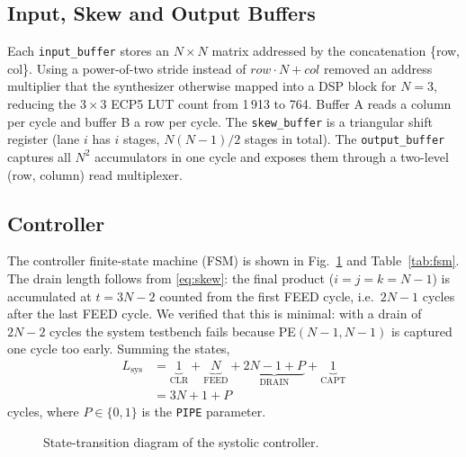 \documentclass[conference]{IEEEtran}
\begin{document}
\subsection{Input, Skew and Output Buffers}
Each \texttt{input\_buffer} stores an $N\times N$ matrix addressed by the
concatenation \{row, col\}. Using a power-of-two stride instead of
$\textit{row}\cdot N+\textit{col}$ removed an address multiplier that the
synthesizer otherwise mapped into a DSP block for $N=3$, reducing the
$3\times3$ ECP5 LUT count from 1\,913 to 764. Buffer A reads a column per
cycle and buffer B a row per cycle. The \texttt{skew\_buffer} is a
triangular shift register (lane $i$ has $i$ stages, $N(N-1)/2$ stages in
total). The \texttt{output\_buffer} captures all $N^2$ accumulators in one
cycle and exposes them through a two-level (row, column) read multiplexer.

\subsection{Controller}
The controller finite-state machine (FSM) is shown in Fig.~\ref{fig:fsm} and Table~\ref{tab:fsm}.
The drain length follows from \eqref{eq:skew}: the final product ($i=j=k=N-1$) is
accumulated at $t=3N-2$ counted from the first FEED cycle, i.e.\ $2N-1$ cycles
after the last FEED cycle. We verified that this is minimal: with a drain of
$2N-2$ cycles the system testbench fails because PE$(N-1,N-1)$ is captured one
cycle too early. Summing the states,
\begin{equation}
\begin{aligned}
L_{\text{sys}} &= \underbrace{1}_{\text{CLR}} + \underbrace{N}_{\text{FEED}} + \underbrace{2N-1+P}_{\text{DRAIN}} + \underbrace{1}_{\text{CAPT}}\\
&= 3N+1+P
\end{aligned}\label{eq:lsys}
\end{equation}
cycles, where $P\in\{0,1\}$ is the \texttt{PIPE} parameter.

\begin{figure}[t]
\centering
{}
\caption{State-transition diagram of the systolic controller.}
\label{fig:fsm}
\end{figure}
\end{document}
